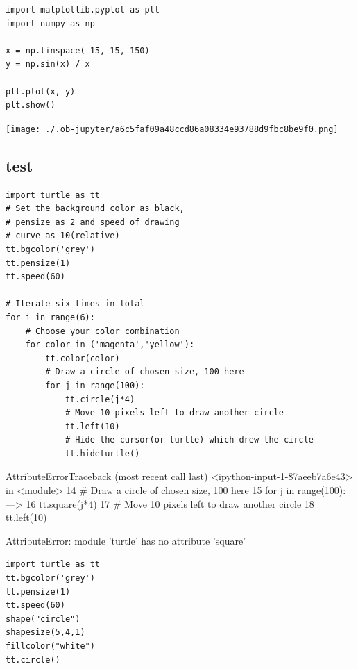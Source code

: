 \documentclass[11pt]{article}
\begin{document}
\begin{verbatim}
import matplotlib.pyplot as plt
import numpy as np

x = np.linspace(-15, 15, 150)
y = np.sin(x) / x

plt.plot(x, y)
plt.show()

\end{verbatim}

\begin{center}
\texttt{[image: ./.ob-jupyter/a6c5faf09a48ccd86a08334e93788d9fbc8be9f0.png]}
\end{center}


\subsection{test}
\label{sec:org39eda75}

\begin{verbatim}
import turtle as tt
# Set the background color as black,
# pensize as 2 and speed of drawing
# curve as 10(relative)
tt.bgcolor('grey')                                                                                                   
tt.pensize(1)
tt.speed(60)

# Iterate six times in total
for i in range(6):
    # Choose your color combination
    for color in ('magenta','yellow'):
        tt.color(color)
        # Draw a circle of chosen size, 100 here
        for j in range(100):
            tt.circle(j*4)
            # Move 10 pixels left to draw another circle
            tt.left(10)
            # Hide the cursor(or turtle) which drew the circle
            tt.hideturtle()
\end{verbatim}

AttributeErrorTraceback (most recent call last)
<ipython-input-1-87aeeb7a6e43> in <module>
     14         \# Draw a circle of chosen size, 100 here
     15         for j in range(100):
---> 16             tt.square(j*4)
     17             \# Move 10 pixels left to draw another circle
     18             tt.left(10)

AttributeError: module 'turtle' has no attribute 'square'


\begin{verbatim}
import turtle as tt
tt.bgcolor('grey')                                                                                                   
tt.pensize(1)
tt.speed(60)
shape("circle")
shapesize(5,4,1)
fillcolor("white")
tt.circle()

\end{verbatim}
\end{document}

